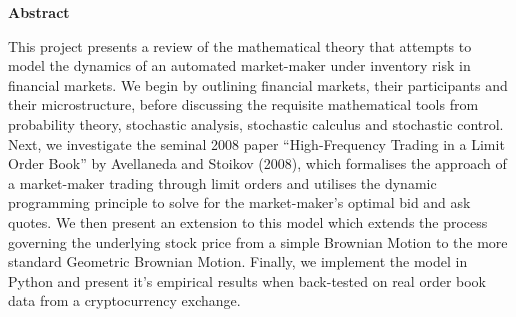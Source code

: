 \thispagestyle{plain}
\mbox{}
\vspace{60mm}
\begin{center}
    \textbf{Abstract}
\end{center}
This project presents a review of the mathematical theory that attempts to model the 
dynamics of an automated market-maker under inventory risk in financial markets. We 
begin by outlining financial markets, their participants and their microstructure, 
before discussing the requisite mathematical tools from probability theory, stochastic 
analysis, stochastic calculus and stochastic control. Next, we investigate the seminal 
2008 paper ``High-Frequency Trading in a Limit Order Book'' by Avellaneda and Stoikov 
(2008), which formalises the approach of a market-maker trading through limit orders 
and utilises the dynamic programming principle to solve for the market-maker's optimal 
bid and ask quotes. We then present an extension to this model which extends the 
process governing the underlying stock price from a simple Brownian Motion to the more 
standard Geometric Brownian Motion. Finally, we implement the model in Python and 
present it's empirical results when back-tested on real order book data from a 
cryptocurrency exchange.
\newpage